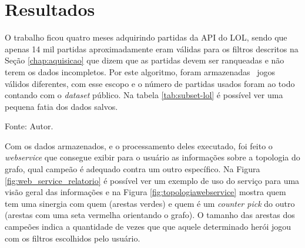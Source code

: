 \chapter{Resultados}

O trabalho ficou quatro meses adquirindo partidas da API do LOL, sendo que apenas 14 mil partidas aproximadamente eram válidas para os filtros descritos na Seção \ref{chap:aquisicao} que dizem que as partidas devem ser ranqueadas e não terem os dados incompletos.
Por este algoritmo, foram armazenadas \numpartidas\ jogos válidos diferentes, com esse escopo e o número de partidas usados foram ao todo \partidasrankeds\, contando com o \textit{dataset} público.
Na tabela \ref{tab:subset-lol} é possível ver uma pequena fatia dos dados salvos.


\begin{table}[H]
	\centering
	\caption{Exemplo de \textit{subset} salvo no banco de dados}
	\label{tab:subset-lol}
	\small{Fonte: Autor.}
\end{table}

Com os dados armazenados, e o processamento deles executado, foi feito o \textit{webservice} que consegue exibir para o usuário as informações sobre a topologia do grafo, qual campeão é adequado contra um outro específico.
Na Figura \ref{fig:web_service_relatorio} é possível ver um exemplo de uso do serviço para uma visão geral das informações e na Figura \ref{fig:topologiawebservice} mostra quem tem uma sinergia com quem (arestas verdes) e quem é um \textit{counter pick} do outro (arestas com uma seta vermelha orientando o grafo). O tamanho das arestas dos campeões indica a quantidade de vezes que que aquele determinado herói jogou com os filtros escolhidos pelo usuário.



